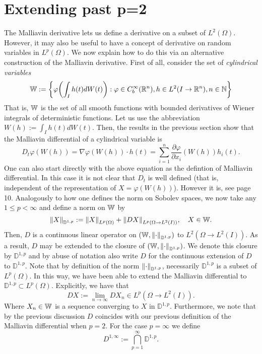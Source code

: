 \documentclass[12pt]{article}
\begin{document}
\section{Extending past p=2}
The Malliavin derivative lets us define a derivative on a subset of $L^2(\Omega)$. However, it may also be useful to have a concept of derivative
on random variables in $L^p(\Omega)$. We now explain how to do this via an alternative construction of the Malliavin derivative. First of all, consider the set of \emph{cylindrical variables}
\begin{equation*}
	\mathbb{W}:=\left\{\varphi\qty(\int_{I}h(t) dW(t)):\varphi\in C_b^\infty({\mathbb R}^n), h\in L^2(I\to{\mathbb R}^n), n \in \mathbb{N} \right\}
\end{equation*}
That is, $\mathbb{W}$ is the set of all smooth functions with bounded derivatives of Wiener integrals of deterministic functions. Let us use the abbreviation  $W(h):=\int_{I}h(t) dW(t)$.
Then, the results in the previous section show that the Malliavin differential of a cylindrical variable is
\begin{equation*}
	D_t\varphi(W(h))=\nabla\varphi(W(h))\cdot h(t)=\sum_{i=1}^{n} \frac{\partial \varphi}{\partial x_i}(W(h))h_i(t).
\end{equation*}
One can also start directly with the above equation as the defintion of Malliavin differential. 
In this case it is not clear that $D_t$ is well defined (that is, independent of the representation of  $X=\varphi(W(h))$). However it is, see \cite{hairer2021introduction} page 10.
Analogously to how one defines the norm on Sobolev spaces, we now take any $1\leq p< \infty $ and define a norm on $\mathbb{W}$ by
\begin{equation*}
	\norm{X}_{\mathbb{D}^{1,p}}:=\norm{X}_{L^p(\Omega)}+\norm{DX}_{L^p(\Omega\to L^2(I))},\quad X\in \mathbb{W}.
\end{equation*}
Then, $D$ is a continuous linear operator on $(\mathbb{W},\norm{\cdot }_{\mathbb{D}^{1,p}})$ to $L^2(\Omega\to L^2(I))$. As a result, $D$ may be extended to the closure of $(\mathbb{W},\norm{\cdot }_{\mathbb{D}^{1,p}})$. We denote this closure by $\mathbb{D}^{1,p}$ and by abuse of notation also write $D$ for the continuous extension of  $D$ to $\mathbb{D}^{1,p}$. Note that by definition of the norm $\norm{\cdot }_{\mathbb{D}^{1,p}}$, necessarily $\mathbb{D}^{1,p}$ is a subset of $L^p(\Omega)$. In this way, we have been
able to extend the Malliavin differential to $\mathbb{D}^{1,p}\subset L^p(\Omega)$. Explicitly, we have that
\begin{equation*}
	D X:=\lim_{n \to \infty}D X_n \in L^p(\Omega\to L^2(I)).
\end{equation*}
Where $X_n \in \mathbb{W}$ is a sequence converging to  $X$ in  $\mathbb{D}^{1,p}$. Furthermore, we note that by the previous discussion $D$ coincides with our previous definition
of the Malliavin differential when $p=2$. For the case $p=\infty$ we define
\begin{equation*}
	D^{1,\infty}:=\bigcap_{p=1} ^\infty \mathbb{D}^{1,p}.
\end{equation*}
\end{document}
